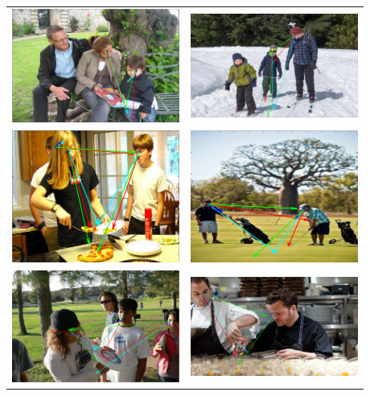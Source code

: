 \documentclass[10pt,twocolumn,letterpaper]{article}
\begin{document}
\begin{table}[ht]
  \centering
  \begin{tabular}{|c|c|}
    \includegraphics[width=55mm]{images/success1.png} & \includegraphics[width=55mm]{images/success2.png} \\
    \includegraphics[width=55mm]{images/success3.png} & \includegraphics[width=55mm]{images/success4.png} \\
    \includegraphics[width=55mm]{images/failure1.png} & \includegraphics[width=55mm]{images/failure2.png} \\

\end{tabular}
\end{table}
\end{document}
